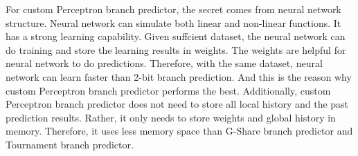 \documentclass[conference]{IEEEtran}
\begin{document}
For custom Perceptron branch predictor, the secret comes from neural network structure. Neural network can simulate both linear and non-linear functions. It has a strong learning capability. Given suffcient dataset, the neural network can do training and store the learning results in weights.
The weights are helpful for neural network to do predictions. Therefore, with the same dataset, neural network can learn faster than 2-bit branch prediction. And this is the reason why custom Perceptron branch predictor performs the best. 
Additionally, custom Perceptron branch predictor does not need to store all local history and the past prediction results. Rather, it only needs to store weights and global history in memory. Therefore, it uses
less memory space than G-Share branch predictor and Tournament branch predictor. 




\end{document}
